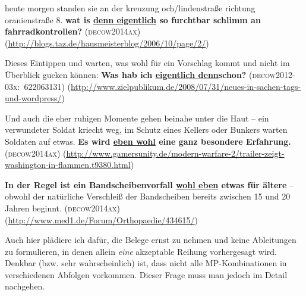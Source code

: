 \begin{exe}
	\ex\label{1199} 
		\begin{xlist}	
			\ex\label{1199a} 
		 
			{heute morgen standen sie an der kreuzung och/lindenstraße richtung oranienstraße 8. \textbf{wat is \underline{denn eigentlich} so furchtbar 				schlimm an fahrradkontrollen?}	
			\hfill\hbox{\scshape(decow2014ax)}			
			\newline
			\hbox{}\hfill\hbox{\scriptsize(\url{http://blogs.taz.de/hausmeisterblog/2006/10/page/2/})}}
			\ex\label{1199b} 
		 
			{Dieses Eintippen und warten, was wohl für ein Vorschlag kommt und nicht im Überblick gucken können: \textbf{Was hab ich \underline{eigentlich denn}\linebreak schon? }    
			\hfill\hbox{\scshape(decow2012-03x: 622063131)}}	
			\newline
			\hbox{}\hfill\hbox{\scriptsize(\url{http://www.zielpublikum.de/2008/07/31/neues-in-sachen-tags-und-wordpress/})}
		\end{xlist}
\end{exe}
	           	
\begin{exe}
	\ex\label{1200} 
		\begin{xlist}
			\ex\label{1200a} 
		 
			{Und auch die eher ruhigen Momente gehen beinahe unter die Haut – ein verwundeter Soldat kriecht weg, im Schutz eines Kellers oder Bunkers 					warten Soldaten auf etwas. \textbf{Es wird \underline{eben wohl} eine ganz besondere Erfahrung.} 	
			\hfill\hbox{\scshape(decow2014ax)}			
			\newline
			\hbox{}\hfill{\scriptsize(\url{http://www.gamersunity.de/modern-warfare-2/trailer-zeigt-washington-in-flammen.t9380.html})}}			
			\ex\label{1200b}
		  
			{\textbf{In der Regel ist ein Bandscheibenvorfall \underline{wohl eben} etwas für ältere} – obwohl der natürliche Verschleiß der Bandscheiben 				bereits zwischen 15 und 20 Jahren beginnt.    
			\hfill\hbox{\scshape(decow2014ax)}	
			\newline
			\hbox{}\hfill\hbox{\scriptsize(\url{http://www.med1.de/Forum/Orthopaedie/434615/})}}
		\end{xlist}
\end{exe}				           	
Auch hier plädiere ich dafür, die Belege ernst zu nehmen und keine Ableitungen zu formulieren, in denen allein \emph{eine} akzeptable Reihung vorhergesagt wird. Denkbar (bzw. sehr wahrscheinlich) ist, dass nicht alle MP-Kom\-bi\-na\-ti\-on\-en in verschiedenen Abfolgen vorkommen. Dieser Frage muss man jedoch im Detail nachgehen.\\

